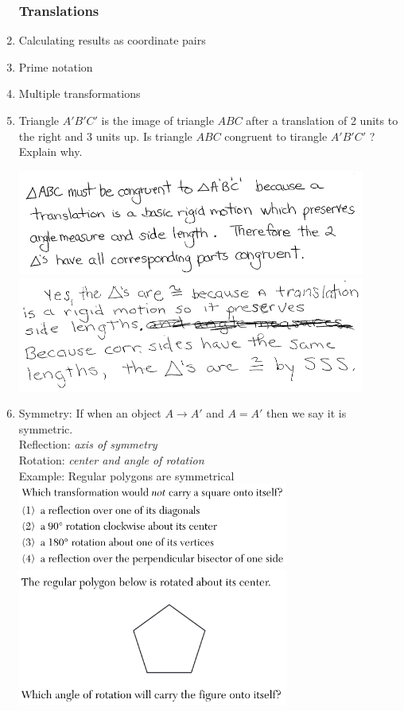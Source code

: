 \documentclass[12pt, twoside]{article}
\begin{document}
  \begin{enumerate}
    \subsubsection*{Translations}
    \item Calculating results as coordinate pairs
    \item Prime notation
    \item Multiple transformations

    \item Triangle $A'B'C'$ is the image of triangle $ABC$ after a translation of 2 units to the right and 3 units up. Is triangle $ABC$ congruent to tirangle $A'B'C'$ ? Explain why.

    \includegraphics[width=0.9\textwidth]{Isometry_JN2018-25-sol.png}\\
    \includegraphics[width=0.9\textwidth]{Isometry_JN2018-25-sol2.png}

    \item Symmetry: If when an object $A \rightarrow A'$ and $A = A'$ then we say it is symmetric. \\
    Reflection: \emph{axis of symmetry}\\
    Rotation: \emph{center and angle of rotation}\\[0.25cm]
    Example: Regular polygons are symmetrical\\[0.25cm]

    \includegraphics[width=0.7\textwidth]{symmetry-square_JA2018-15.png}\\[0.5cm]
    \includegraphics[width=0.7\textwidth]{symmetry_JN2018-19.png}

  \end{enumerate}
\end{document}
